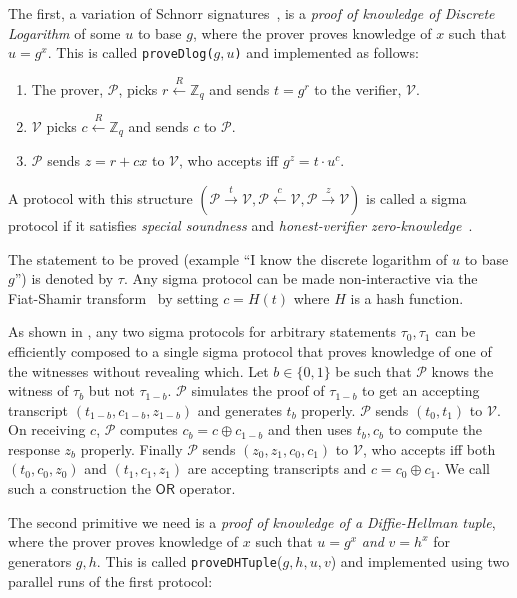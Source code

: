 \documentclass[runningheads]{llncs}
\newcommand{\ornode}{\ensuremath{\mathsf{OR}}}
\begin{document}
The first, a variation of Schnorr signatures~\cite{Sch91}, is a {\em proof of knowledge of Discrete Logarithm} of some $u$ to base $g$, where the prover proves knowledge of $x$ such that $u = g^x$. This is called \texttt{proveDlog($g, u$)} and implemented as follows:
\begin{enumerate}
	\item The prover, $\mathcal{P}$, picks $r \stackrel{R}{\leftarrow} \mathbb{Z}_q$ and sends $t = g^r$ to the verifier, $\mathcal{V}$.
	\item $\mathcal{V}$ picks $c \stackrel{R}{\leftarrow} \mathbb{Z}_q$ and sends $c$ to $\mathcal{P}$.
	\item $\mathcal{P}$ sends $z = r + cx$ to $\mathcal{V}$, who accepts iff ${g}^z = t\cdot {u}^c$. 
	
\end{enumerate}

A protocol with this structure $(\mathcal{P} \stackrel{t}{\rightarrow}\mathcal{V}, \mathcal{P} \stackrel{c}{\leftarrow}\mathcal{V}, \mathcal{P} \stackrel{z}{\rightarrow}\mathcal{V})$ is called a sigma protocol if it satisfies {\em special soundness} and {\em honest-verifier zero-knowledge}~\cite{Dam10}. 

The statement to be proved (example ``I know the discrete logarithm of $u$ to base $g$'') is denoted by $\tau$.
Any sigma protocol can be made non-interactive via the Fiat-Shamir transform~\cite{fiatshamir} by setting $c= H(t)$ where $H$ is a hash function. 

As shown in \cite{CDS94}, any two sigma protocols for arbitrary statements $\tau_0, \tau_1$ can be efficiently composed to a single sigma protocol that proves knowledge of one of the witnesses without revealing which. Let $b \in \{0, 1\}$ be such that $\mathcal{P}$ knows the witness of $\tau_{b}$ but not $\tau_{1-b}$. 
$\mathcal{P}$ simulates the proof of $\tau_{1-b}$ to get an accepting transcript $(t_{1-b}, c_{1-b}, z_{1-b})$ and generates $t_b$ properly. $\mathcal{P}$ sends $(t_0, t_1)$ to $\mathcal{V}$. On receiving $c$, $\mathcal{P}$ computes $c_b = c \oplus c_{1-b}$ and then uses $t_b, c_b$ to compute the response $z_b$ properly. Finally $\mathcal{P}$ sends $(z_0, z_1, c_0, c_1)$ to $\mathcal{V}$, who accepts iff both $(t_0, c_0, z_0)$ and $(t_1, c_1, z_1)$ are accepting transcripts and $c = c_0 \oplus c_1$.
We call such a construction the $\ornode$ operator. 

The second primitive we need is a {\em proof of knowledge of a Diffie-Hellman tuple}, where the prover proves knowledge of $x$ such that $u = g^x$ {\em and} $v = h^x$ for generators $g, h$.
This is called \texttt{proveDHTuple}($g, h, u, v$) and implemented using two parallel runs of the first protocol:
\end{document}
